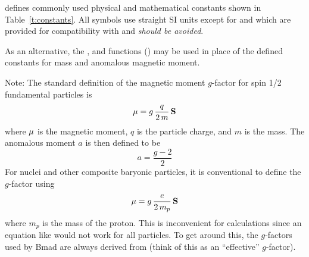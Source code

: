 {{{{{\bmad defines commonly used physical and mathematical constants shown in Table~\ref{t:constants}.
All symbols use straight SI units except for  and  which are provided for
compatibility with \mad and {\large\em should be avoided}.

As an alternative, the , and  functions
() may be used in place of the defined constants for mass and anomalous
magnetic moment.

Note: The standard definition of the magnetic moment $g$-factor for spin 1/2 fundamental particles is
\begin{equation}
  {\bf \mu} = g \, \frac{q}{2 \, m} \, {\bf S}
  \label{mgq2m}
\end{equation}
where ${\bf \mu}$ is the magnetic moment, $q$ is the particle charge, and $m$ is the mass. The
anomalous moment $a$ is then defined to be
\begin{equation}
  a = \frac{g-2}{2}
\end{equation}
For nuclei and other composite baryonic particles, it is conventional to define the $g$-factor using
\begin{equation}
  {\bf \mu} = g \, \frac{e}{2 \, m_p} \, {\bf S}
  \label{mgq2m2}
\end{equation}
where $m_p$ is the mass of the proton. This is inconvenient for calculations since an equation like
 would not work for all particles. To get around this, the $g$-factors used by Bmad are
always derived from  (think of this as an ``effective'' $g$-factor).

}}}}}
